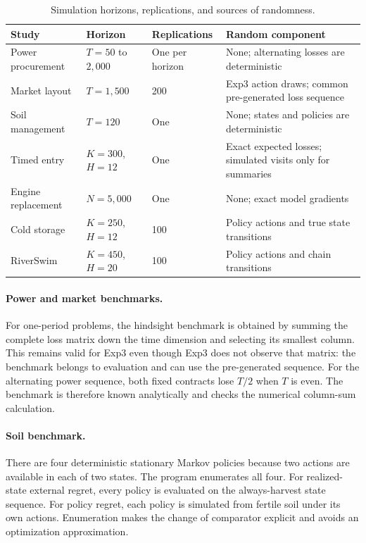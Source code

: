 \begin{table}[htbp]
\centering
\caption{Simulation horizons, replications, and sources of randomness.}
\label{tab:online_simulation_calibration}
\small
\begin{tabular}{p{}p{}p{}p{}}
\toprule
Study & Horizon & Replications & Random component \\
\midrule
Power procurement & $T=50$ to $2{,}000$ & One per horizon & None; alternating losses are deterministic \\
Market layout & $T=1{,}500$ & 200 & Exp3 action draws; common pre-generated loss sequence \\
Soil management & $T=120$ & One & None; states and policies are deterministic \\
Timed entry & $K=300$, $H=12$ & One & Exact expected losses; simulated visits only for summaries \\
Engine replacement & $N=5{,}000$ & One & None; exact model gradients \\
Cold storage & $K=250$, $H=12$ & 100 & Policy actions and true state transitions \\
RiverSwim & $K=450$, $H=20$ & 100 & Policy actions and chain transitions \\
\bottomrule
\end{tabular}
\end{table}

\paragraph{Power and market benchmarks.}
For one-period problems, the hindsight benchmark is obtained by summing the complete loss matrix down the time dimension and selecting its smallest column. This remains valid for Exp3 even though Exp3 does not observe that matrix: the benchmark belongs to evaluation and can use the pre-generated sequence. For the alternating power sequence, both fixed contracts lose $T/2$ when $T$ is even. The benchmark is therefore known analytically and checks the numerical column-sum calculation.

\paragraph{Soil benchmark.}
There are four deterministic stationary Markov policies because two actions are available in each of two states. The program enumerates all four. For realized-state external regret, every policy is evaluated on the always-harvest state sequence. For policy regret, each policy is simulated from fertile soil under its own actions. Enumeration makes the change of comparator explicit and avoids an optimization approximation.

